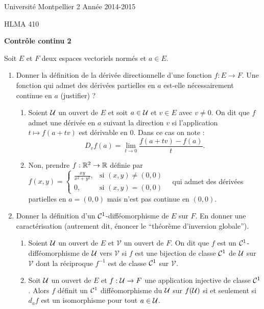 \documentclass[a4paper]{article}
\begin{document}
\noindent Université Montpellier 2 \hfill Année 2014-2015

\noindent HLMA 410
 


\bigskip

\begin{center}
{\large \sffamily\bfseries Contrôle continu 2}
\end{center}


\bigskip
\bigskip

 Soit $E$ et $F$ deux espaces vectoriels normés et $a\in E$. 


\begin{enumerate}
	\item Donner la définition de la dérivée directionnelle d'une fonction $f:E\to F$. Une fonction qui admet des dérivées partielles en $a$ est-elle nécessairement continue en $a$ (justifier) ?
\medskip
		\begin{enumerate}
			\item Soient $\mathcal{U}$ un ouvert de $E$ et soit $a\in \mathcal{U}$ et $v\in E$ avec $v\neq 0$. On dit que $f$ admet une dérivée en $a$ suivant la direction $v$ si l'application $t\mapsto f(a+tv) $ est dérivable en $0$. Dans ce cas on note :
\[
	D_v f(a) = \lim_{t\to 0} \frac{f(a+tv) - f(a)}{t}.
\]
			\item Non, prendre $f:\mathbb{R}^2 \to \mathbb{R} $ définie par $f(x,y)= \begin{cases}\frac{xy}{x^2+y^2}, &\text{si $(x,y) \neq (0,0)$} \\ 0, & \text{si $(x,y) =(0,0)$ }\end{cases} $ qui admet des dérivées partielles en $a=(0,0)$ mais n'est pas continue en $(0,0)$.
		\end{enumerate}

\medskip

	\item Donner la définition d'un $\mathcal{C}^{1}$-difféomorphisme de $E$ sur $F$. En donner une caractérisation (autrement dit, énoncer le ``théorème d'inversion globale'').

\medskip
		\begin{enumerate}
			\item Soient $\mathcal{U}$ un ouvert de $E$ et $\mathcal V$ un ouvert de $F$. On dit que $f$ est un $\mathcal{C}^1$-difféomorphisme de $\mathcal{U}$ vers $\mathcal V$ si $f$ est une bijection de classe $\mathcal{C}^1$ de $\mathcal{U}$ sur $\mathcal V$  dont la réciproque $f^{-1}$ est de classe $\mathcal{C}^1$ sur $\mathcal V$.
\item Soit $\mathcal{U}$ un ouvert de $E$ et $f:\mathcal{U} \to F$ une application injective de classe $\mathcal{C}^1$. Alors $f$ définit un $\mathcal{C}^1$ difféomorphisme du $\mathcal{U}$ sur $f(\mathcal{U})$ si et seulement si $d_a f$ est un isomorphisme pour tout $a\in\mathcal{U}$.
		\end{enumerate}
\medskip
\end{enumerate}
\end{document}
